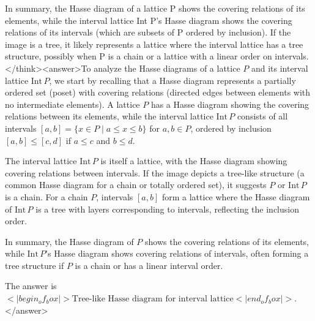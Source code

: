 In summary, the Hasse diagram of a lattice P shows the covering relations of its elements, while the interval lattice Int P's Hasse diagram shows the covering relations of its intervals (which are subsets of P ordered by inclusion). If the image is a tree, it likely represents a lattice where the interval lattice has a tree structure, possibly when P is a chain or a lattice with a linear order on intervals.</think><answer>To analyze the Hasse diagrams of a lattice \( P \) and its interval lattice \( \text{Int}\,P \), we start by recalling that a Hasse diagram represents a partially ordered set (poset) with covering relations (directed edges between elements with no intermediate elements). A lattice \( P \) has a Hasse diagram showing the covering relations between its elements, while the interval lattice \( \text{Int}\,P \) consists of all intervals \( [a, b] = \{x \in P \mid a \leq x \leq b\} \) for \( a, b \in P \), ordered by inclusion \( [a, b] \leq [c, d] \) if \( a \leq c \) and \( b \leq d \).  

The interval lattice \( \text{Int}\,P \) is itself a lattice, with the Hasse diagram showing covering relations between intervals. If the image depicts a tree-like structure (a common Hasse diagram for a chain or totally ordered set), it suggests \( P \) or \( \text{Int}\,P \) is a chain. For a chain \( P \), intervals \( [a, b] \) form a lattice where the Hasse diagram of \( \text{Int}\,P \) is a tree with layers corresponding to intervals, reflecting the inclusion order.  

In summary, the Hasse diagram of \( P \) shows the covering relations of its elements, while \( \text{Int}\,P \)'s Hasse diagram shows covering relations of intervals, often forming a tree structure if \( P \) is a chain or has a linear interval order.  

The answer is \(<|begin_of_box|>\text{Tree-like Hasse diagram for interval lattice}<|end_of_box|>\).</answer>